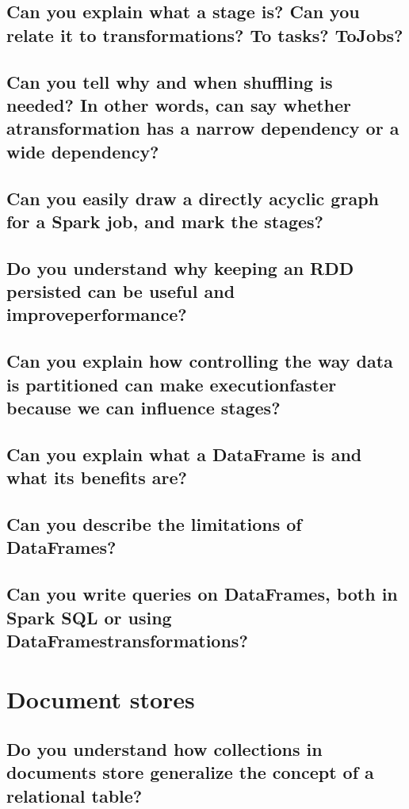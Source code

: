 \documentclass{article}
\begin{document}
\subsection{Can you explain what a stage is? Can you relate it to transformations? To tasks? ToJobs?}
\subsection{Can you tell why and when shuffling is needed? In other words, can say whether atransformation has a narrow dependency or a wide dependency?}
\subsection{Can you easily draw a directly acyclic graph for a Spark job, and mark the stages?}
\subsection{Do you understand why keeping an RDD persisted can be useful and improveperformance?}
\subsection{Can you explain how controlling the way data is partitioned can make executionfaster because we can influence stages?}
\subsection{Can you explain what a DataFrame is and what its benefits are?}
\subsection{Can you describe the limitations of DataFrames?}
\subsection{Can you write queries on DataFrames, both in Spark SQL or using DataFramestransformations?}

\pagebreak

\section{Document stores}
\subsection{Do you understand how collections in documents store generalize the concept of a relational table?}
\end{document}
